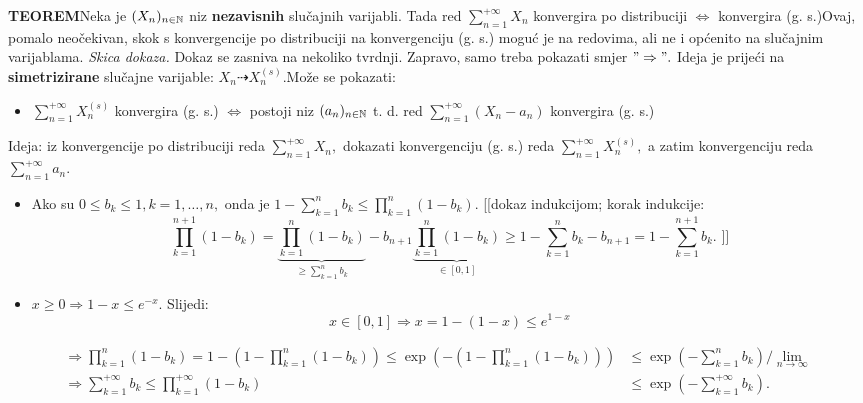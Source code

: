 \documentclass{article}
\begin{document}
\textbf{TEOREM}\newline Neka je \((X_n)_{n\in\Bbb N}\) niz \textbf{nezavisnih} slučajnih varijabli. Tada red \(\displaystyle\sum_{n=1}^{+\infty}X_n\) konvergira po distribuciji \(\Leftrightarrow\) konvergira (g. s.)\newline\newline Ovaj, pomalo neočekivan, skok s konvergencije po distribuciji na konvergenciju (g. s.) moguć je na redovima, ali ne i općenito na slučajnim varijablama.\newline\newline 
\textit{Skica dokaza.}\newline
Dokaz se zasniva na nekoliko tvrdnji. Zapravo, samo treba pokazati smjer \("\Rightarrow".\) Ideja je prijeći na \textbf{simetrizirane} slučajne varijable: \(X_n\dashrightarrow X_n^{(s)}.\)\newline Može se pokazati:
\begin{itemize}
    \item[] \(\displaystyle\sum_{n=1}^{+\infty}X_n^{(s)}\) konvergira (g. s.) \(\Leftrightarrow\) postoji niz \((a_n)_{n\in\Bbb N}\) t. d. red \(\displaystyle\sum_{n=1}^{+\infty}(X_n-a_n)\) konvergira (g. s.)
\end{itemize}
Ideja: iz konvergencije po distribuciji reda \(\displaystyle\sum_{n=1}^{+\infty}X_n,\) dokazati konvergenciju (g. s.) reda \(\displaystyle\sum_{n=1}^{+\infty}X_n^{(s)},\) a zatim konvergenciju reda \(\displaystyle\sum_{n=1}^{+\infty}a_n.\) 
\begin{itemize}
    \item[\ding{228}] Ako su \(0\le b_k\le 1,k=1,\ldots,n,\) onda je \(\displaystyle 1-\sum_{k=1}^nb_k\le\prod_{k=1}^n(1-b_k).\) [[dokaz indukcijom; korak indukcije: \[\prod_{k=1}^{n+1}(1-b_k)=\underbrace{\prod_{k=1}^n(1-b_k)}_{\ge\displaystyle\sum_{k=1}^nb_k}-b_{n+1}\underbrace{\prod_{k=1}^n(1-b_k)}_{\in[0,1]}\ge1-\sum_{k=1}^nb_k-b_{n+1}=1-\sum_{k=1}^{n+1}b_k.\text{ ]]}\]
    \item[\ding{228}] \(x\ge0\Rightarrow 1-x\le e^{-x}.\) Slijedi: \[x\in[0,1]\Rightarrow x=1-(1-x)\le e^{1-x}\]  
\end{itemize}
\[\begin{aligned}\Rightarrow \prod_{k=1}^n(1-b_k)=1-\left(1-\prod_{k=1}^n(1-b_k)\right)\le\exp\left(-\left(1-\prod_{k=1}^n(1-b_k)\right)\right)&\le\exp\left(-\sum_{k=1}^nb_k\right)\bigg/\lim_{n\to\infty}\\\Rightarrow\sum_{k=1}^{+\infty}b_k\le\prod_{k=1}^{+\infty}(1-b_k)&\le\exp\left(-\sum_{k=1}^{+\infty}b_k\right).\end{aligned}\]
\end{document}

